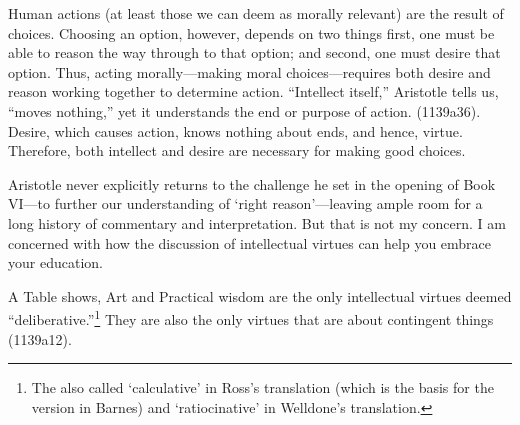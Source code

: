 Human actions (at least those we can deem as morally relevant) are the result of choices. Choosing an option, however, depends on two things first, one must be able to reason the way through to that option; and second, one must desire that option. Thus, acting morally---making moral choices---requires both desire and reason working together to determine action. ``Intellect itself,'' Aristotle tells us, ``moves nothing,'' yet it understands the end or purpose of action. (1139a36). Desire, which causes action, knows nothing about ends, and hence, virtue. Therefore, both intellect and desire are necessary for making good choices. 

Aristotle never explicitly returns to the challenge he set in the opening of Book VI---to further our understanding of `right reason'---leaving ample room for a long history of commentary and interpretation. But that is not my concern. I am concerned with how the discussion of intellectual virtues can help you embrace your education.

A Table  shows, Art and Practical wisdom are the only intellectual virtues deemed ``deliberative.''\footnote{The also called `calculative' in Ross's translation (which is the basis for the version in Barnes) and `ratiocinative' in Welldone's translation.} They are also the only virtues that are about contingent things (1139a12).

